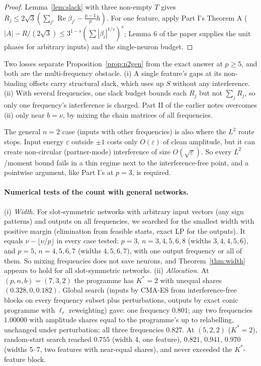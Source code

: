 \documentclass[11pt]{article}
\theoremstyle{definition}
\renewcommand{\Re}{\operatorname{Re}}
\begin{document}
\begin{proof}
Lemma~\ref{lem:slack} with three non-empty $T$ gives $R_j\le2\sqrt3(\sum_{j'}\Re\beta_{j'}-\frac{p-1}ph)$.  For one feature,
apply Part I's Theorem A ($|A|-R/(2\sqrt3)\le3^{1-s}(\sum|\beta_i|^{1/s})^s$; Lemma 6 of the paper supplies the unit phases for
arbitrary inputs) and the single-neuron budget.
\end{proof}
Two losses separate Proposition~\ref{prop:n2gen} from the exact answer at $p\ge5$, and both are the multi-frequency
obstacle.  (i) A single feature's gaps at its non-binding offsets carry structural slack, which uses up $S$ without any
interference.  (ii) With several frequencies, one slack budget bounds each $R_j$ but not $\sum_jR_j$, so only one
frequency's interference is charged.  Part II of the earlier notes overcomes (ii) only near $b=\nu$, by mixing the chain
matrices of all frequencies.

The general $n=2$ case (inputs with other frequencies) is also where the $L^2$ route stops.  Input energy $\varepsilon$ outside
$\pm1$ costs only $O(\varepsilon)$ of clean amplitude, but it can create non-circular (partner-mode) interference of size
$O(\sqrt\varepsilon)$.  So every $L^2$/moment bound fails in a thin regime next to the interference-free point, and a pointwise
argument, like Part I's at $p=3$, is required.

\paragraph{Numerical tests of the count with general networks.}  (i) \emph{Width.}  For slot-symmetric networks with
arbitrary input vectors (any sign patterns) and outputs on all frequencies, we searched for the smallest width with
positive margin (elimination from feasible starts, exact LP for the outputs).  It equals $\nu-\lfloor\nu/p\rfloor$ in every case
tested: $p=3$, $n=3,4,5,6,8$ (widths $3,4,4,5,6$), and $p=5$, $n=4,5,6,7$ (widths $4,5,6,7$), with one output frequency
or all of them.  So mixing frequencies does not save neurons, and Theorem~\ref{thm:width} appears to hold for all
slot-symmetric networks.
(ii) \emph{Allocation.}  At $(p,n,b)=(7,3,2)$ the programme has $K^*=2$ with unequal shares $(0.328,0,0.182)$.  Global
search (inputs by CMA-ES from interference-free blocks on every frequency subset plus perturbations, outputs by exact
conic programme with $\ell_r$ reweighting) gave: one frequency $0.801$; any two frequencies $1.00000$ with amplitude shares
equal to the programme's up to relabelling, unchanged under perturbation; all three frequencies $0.827$.  At $(5,2,2)$
($K^*=2$), random-start search reached $0.755$ (width 4, one feature), $0.821$, $0.941$, $0.970$ (widths 5--7, two features
with near-equal shares), and never exceeded the $K^*$-feature block.
\end{document}
